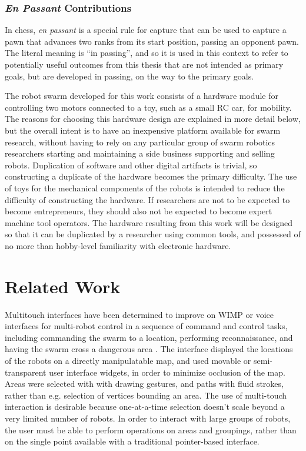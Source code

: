 \documentclass[]{article}
\begin{document}
\subsubsection{\emph{En Passant} Contributions}

In chess, \emph{en passant} is a special rule for capture that can be used to capture a pawn that advances two ranks from its start position, passing an opponent pawn. 
The literal meaning is ``in passing'', and so it is used in this context to refer to potentially useful outcomes from this thesis that are not intended as primary goals, but are developed in passing, on the way to the primary goals. 

The robot swarm developed for this work consists of a hardware module for controlling two motors connected to a toy, such as a small RC car, for mobility. 
The reasons for choosing this hardware design are explained in more detail below, but the overall intent is to have an inexpensive platform available for swarm research,
without having to rely on any particular group of swarm robotics researchers starting and maintaining a side business supporting and selling robots.
Duplication of software and other digital artifacts is trivial, so constructing a duplicate of the hardware becomes the primary difficulty. 
The use of toys for the mechanical components of the robots is intended to reduce the difficulty of constructing the hardware. 
If researchers are not to be expected to become entrepreneurs, they should also not be expected to become expert machine tool operators.
The hardware resulting from this work will be designed so that it can be duplicated by a researcher using common tools, and possessed of no more than hobby-level familiarity with electronic hardware.

\section{Related Work}

Multitouch interfaces have been determined to improve on WIMP or voice interfaces for multi-robot control in a sequence of command and control tasks, including commanding the swarm to a location, performing reconnaissance, and having the swarm cross a dangerous area \cite{hayes2010multi}.
The interface displayed the locations of the robots on a directly manipulatable map, and used movable or semi-transparent user interface widgets, in order to minimize occlusion of the map. 
Areas were selected with with drawing gestures, and paths with fluid strokes, rather than e.g. selection of vertices bounding an area.
The use of multi-touch interaction is desirable because one-at-a-time selection doesn't scale beyond a very limited number of robots.
In order to interact with large groups of robots, the user must be able to perform operations on areas and groupings, rather than on the single point available with a traditional pointer-based interface. 
\end{document}
